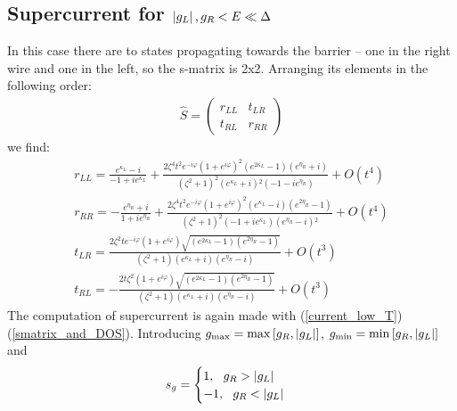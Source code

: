 \subsection{Supercurrent for $  \left|g_L\right|, g_R<E\ll\Delta $ }

In this case there are to states propagating towards the barrier -- one in the right wire and one in the left, so the s-matrix is 2x2. Arranging its elements in the following order:
\begin{gather}
\label{s_matrix_2D}
	\hat{S}
	=
	\begin{pmatrix}
	r_{LL} & t_{LR} \\ 
	t_{RL} & r_{RR}
	\end{pmatrix}
\end{gather}
we find:
\begin{gather}
	r_{LL}
	=
	\frac{e^{\kappa _L}-i}{-1+i e^{\kappa _L}}+\frac{2 \zeta ^4 t^2 e^{-i \varphi } \left(1+e^{i \varphi }\right)^2 \left(e^{2 \kappa _L}-1\right) \left(e^{\eta _R}+i\right)}{\left(\zeta ^2+1\right)^2 \left(e^{\kappa _L}+i\right){}^2 \left(-1-i e^{\eta _R}\right)}+O\left(t^4\right)
	\\
	r_{RR}
	=
	-\frac{e^{\eta _R}+i}{1+i e^{\eta _R}}
	+
	\frac{2 \zeta ^4 t^2 e^{-i \varphi } \left(1+e^{i \varphi }\right)^2 \left(e^{\kappa _L}-i\right) \left(e^{2 \eta _R}-1\right)}{\left(\zeta ^2+1\right)^2 \left(-1+i e^{\kappa _L}\right) \left(e^{\eta _R}-i\right){}^2}+O\left(t^4\right)
	\\
	t_{LR}=
	\frac{2 \zeta ^2 t e^{-i \varphi } \left(1+e^{i \varphi }\right) \sqrt{\left(e^{2 \kappa _L}-1\right) \left(e^{2 \eta _R}-1\right)}}{\left(\zeta ^2+1\right) \left(e^{\kappa _L}+i\right) \left(e^{\eta _R}-i\right)}+O\left(t^3\right)
	\\
	t_{RL}
	=
	-\frac{2 t \zeta ^2 \left(1+e^{i \varphi }\right) \sqrt{\left(e^{2 \kappa _L}-1\right) \left(e^{2 \eta _R}-1\right)}}{\left(\zeta ^2+1\right) \left(e^{\kappa _L}+i\right) \left(e^{\eta _R}-i\right)}+O\left(t^3\right)
\end{gather}
The computation of supercurrent is again made with (\ref{current_low_T}) (\ref{smatrix_and_DOS}). Introducing $g_{\mathrm{max}}=\max\left[g_R,\left|g_L\right|\right]  $,  $g_{\mathrm{min}}=\min\left[g_R,\left|g_L\right|\right]  $  and 
\begin{gather}
	s_g
	=
	\begin{cases}
	1,~~g_R>\left|g_L\right|
	\\
	-1,~~g_R<\left|g_L\right|
	\end{cases}
\end{gather}

